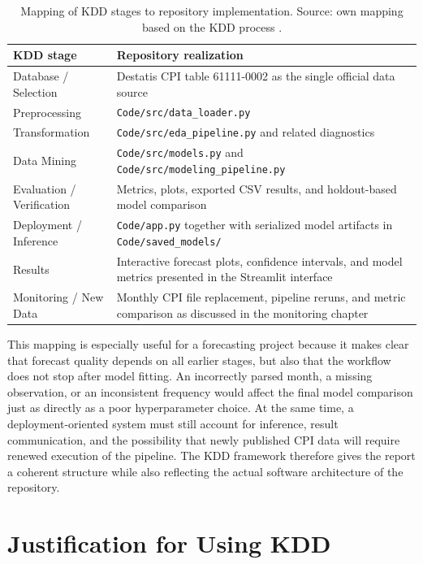 \begin{table}[htbp]
    \centering
    \caption{Mapping of KDD stages to repository implementation. Source: own mapping based on the KDD process \cite{Fayyad:1996}.}
    \label{tab:kdd-mapping}
    \begin{tabular}{p{3cm}p{9.5cm}}
        \hline
        KDD stage & Repository realization \\
        \hline
        Database / Selection & Destatis CPI table 61111-0002 as the single official data source \\
        Preprocessing & \texttt{Code/src/data\_loader.py} \\
        Transformation & \texttt{Code/src/eda\_pipeline.py} and related diagnostics \\
        Data Mining & \texttt{Code/src/models.py} and \texttt{Code/src/modeling\_pipeline.py} \\
        Evaluation / Verification & Metrics, plots, exported CSV results, and holdout-based model comparison \\
        Deployment / Inference & \texttt{Code/app.py} together with serialized model artifacts in \texttt{Code/saved\_models/} \\
        Results & Interactive forecast plots, confidence intervals, and model metrics presented in the Streamlit interface \\
        Monitoring / New Data & Monthly CPI file replacement, pipeline reruns, and metric comparison as discussed in the monitoring chapter \\
        \hline
    \end{tabular}
\end{table}

This mapping is especially useful for a forecasting project because it makes clear that forecast quality depends on all earlier stages, but also that the workflow does not stop after model fitting. An incorrectly parsed month, a missing observation, or an inconsistent frequency would affect the final model comparison just as directly as a poor hyperparameter choice. At the same time, a deployment-oriented system must still account for inference, result communication, and the possibility that newly published CPI data will require renewed execution of the pipeline. The KDD framework therefore gives the report a coherent structure while also reflecting the actual software architecture of the repository.

\section{Justification for Using KDD}

